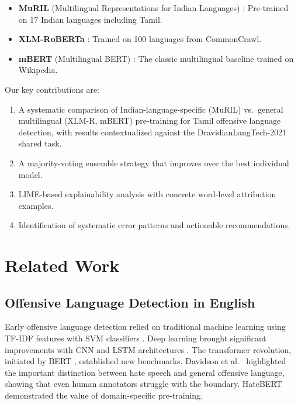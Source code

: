 \documentclass[conference]{IEEEtran}
\begin{document}
\begin{itemize}
    \item \textbf{MuRIL} (Multilingual Representations for Indian Languages) \cite{khanuja2021muril}: Pre-trained on 17 Indian languages including Tamil.
    \item \textbf{XLM-RoBERTa} \cite{conneau2020xlmr}: Trained on 100 languages from CommonCrawl.
    \item \textbf{mBERT} (Multilingual BERT) \cite{devlin2019bert}: The classic multilingual baseline trained on Wikipedia.
\end{itemize}

Our key contributions are:
\begin{enumerate}
    \item A systematic comparison of Indian-language-specific (MuRIL) vs.\ general multilingual (XLM-R, mBERT) pre-training for Tamil offensive language detection, with results contextualized against the DravidianLangTech-2021 shared task.
    \item A majority-voting ensemble strategy that improves over the best individual model.
    \item LIME-based explainability analysis with concrete word-level attribution examples.
    \item Identification of systematic error patterns and actionable recommendations.
\end{enumerate}

\section{Related Work}

\subsection{Offensive Language Detection in English}

Early offensive language detection relied on traditional machine learning using TF-IDF features with SVM classifiers \cite{waseem2016hateful}. Deep learning brought significant improvements with CNN and LSTM architectures \cite{badjatiya2017deep}. The transformer revolution, initiated by BERT \cite{devlin2019bert}, established new benchmarks. Davidson et al.\ \cite{davidson2017automated} highlighted the important distinction between hate speech and general offensive language, showing that even human annotators struggle with the boundary. HateBERT \cite{caselli2021hatebert} demonstrated the value of domain-specific pre-training.
\end{document}
